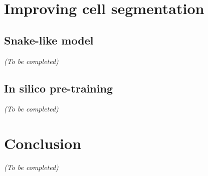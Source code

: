 \section{Improving cell segmentation}
\label{sec:segmentation_improvements}

\subsection{Snake-like model}
\label{subsec:segmentation_snake}

\begin{center}
	\textit{(To be completed)}
\end{center}


\subsection{In silico pre-training}
\label{subsec:segmentation_insilico}

\begin{center}
	\textit{(To be completed)}
\end{center}



\section{Conclusion}
\label{sec:segmentation_conclusion}

\begin{center}
	\textit{(To be completed)}
\end{center}